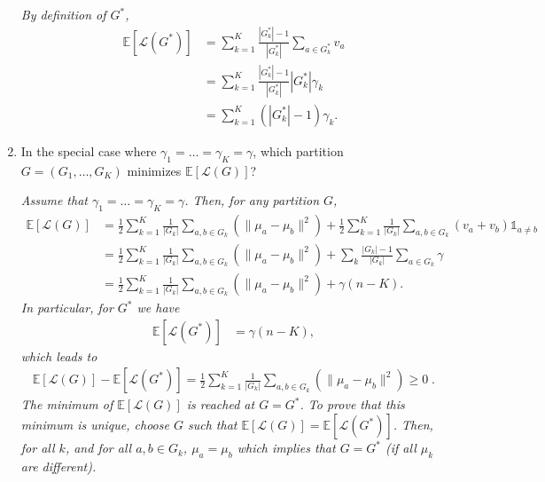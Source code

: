 \documentclass[a4paper,10pt,fleqn]{article}
\newcommand{\E}{\ensuremath{\mathbb{E}}}
\newcommand{\1}{\ensuremath{\mathbbm{1}}}
\newcommand{\crit}{\mathcal{L}}
\begin{document}
\begin{enumerate}
\vspace{.2cm}

{\em
By definition of  $G^*$,  
	\begin{align*}
	\E \left[ \crit(G^*) \right] & =\sum_{k=1}^K \frac{|G^*_k|-1}{|G^*_k|} \sum_{a \in G^*_{k}} v_a\\
	& = \sum_{k=1}^K \frac{|G^*_k|-1}{|G^*_k|} |G^*_k| \gamma_k\\
	& = \sum_{k=1}^K (|G^*_k|-1) \gamma_k.
	\end{align*}
}
\item In the special case where $\gamma_{1}=\ldots=\gamma_{K}=\gamma$, which partition $G=(G_{1},\ldots,G_{K})$ minimizes $\E[\crit(G)]$?

\vspace{.2cm}

{\em
Assume that $\gamma_1 = \hdots = \gamma_K = \gamma$. Then, for any partition $G$, 
	\begin{align*}
	\E \left[ \crit(G) \right] & = \frac{1}{2}  \sum_{k=1}^K \frac{1}{|G_k|}\sum_{a, b\in G_{k}} \left( \| \mu_a - \mu_b\|^2 \right)
	+ \frac{1}{2}  \sum_{k=1}^K \frac{1}{|G_k|}\sum_{a, b\in G_{k}} \left( v_a + v_b \right) \mathds{1}_{a \neq b}\\
	& = \frac{1}{2}  \sum_{k=1}^K \frac{1}{|G_k|}\sum_{a, b\in G_{k}} \left( \| \mu_a - \mu_b\|^2 \right) + \sum_k \frac{|G_k|-1}{|G_k|} \sum_{a \in G_k} \gamma\\
	& = \frac{1}{2}  \sum_{k=1}^K \frac{1}{|G_k|}\sum_{a, b\in G_{k}} \left( \| \mu_a - \mu_b\|^2 \right) + \gamma(n-K).
	\end{align*}
	In particular, for $G^*$ we have
	\begin{align*}
	\E \left[ \crit(G^*) \right] & = \gamma(n-K),
	\end{align*}
	which leads to 
	\begin{align*}
	\E \left[ \crit(G) \right] - \E \left[ \crit(G^*) \right] = \frac{1}{2}  \sum_{k=1}^K \frac{1}{|G_k|}\sum_{a, b\in G_{k}} \left( \| \mu_a - \mu_b\|^2 \right) \geq 0\;.
	\end{align*}
	The minimum of $\E \left[ \crit(G) \right]$ is reached at $G = G^*$. To prove that this minimum is unique, choose $G$ such that $\E \left[ \crit(G) \right] = \E \left[ \crit(G^*) \right]$. Then, for all $k$, and for all $a,b \in G_k$,  $\mu_a = \mu_b$ which implies that $G = G^*$ (if all $\mu_k$ are different).
}
\end{enumerate}
	
	
\end{document}
